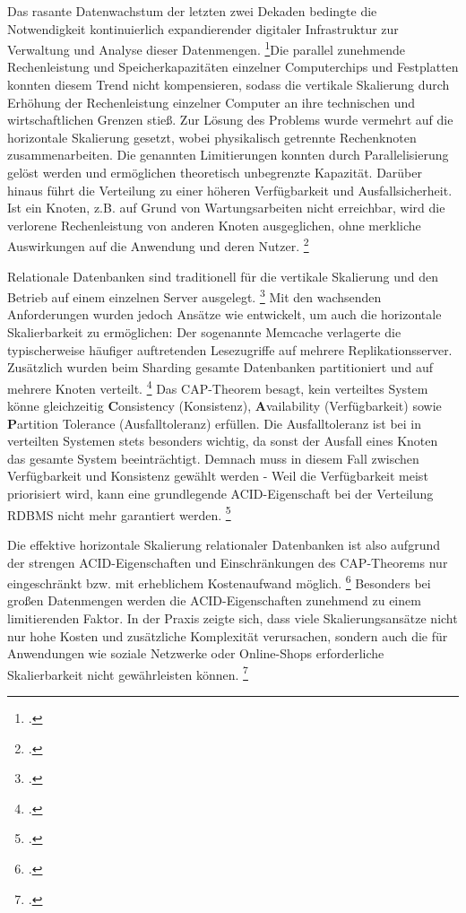 Das rasante Datenwachstum der letzten zwei Dekaden bedingte die Notwendigkeit kontinuierlich expandierender digitaler Infrastruktur zur Verwaltung und Analyse dieser Datenmengen. \footcite{petrocAmountDataCreated2024}Die parallel zunehmende Rechenleistung und Speicherkapazitäten einzelner Computerchips und Festplatten konnten diesem Trend nicht kompensieren, sodass die vertikale Skalierung durch Erhöhung der Rechenleistung einzelner Computer an ihre technischen und wirtschaftlichen Grenzen stieß. Zur Lösung des Problems wurde vermehrt auf die horizontale Skalierung gesetzt, wobei physikalisch getrennte Rechenknoten zusammenarbeiten. Die genannten Limitierungen konnten durch Parallelisierung gelöst werden und ermöglichen theoretisch unbegrenzte Kapazität. Darüber hinaus führt die Verteilung zu einer höheren Verfügbarkeit und Ausfallsicherheit. Ist ein Knoten, z.B. auf Grund von Wartungsarbeiten nicht erreichbar, wird die verlorene Rechenleistung von anderen Knoten ausgeglichen, ohne merkliche Auswirkungen auf die Anwendung und deren Nutzer. \footcite[S. 120]{uyangaComparativeStudyNoSQL2021}

Relationale Datenbanken sind traditionell für die vertikale Skalierung und den Betrieb auf einem einzelnen Server ausgelegt. \footcite{sahatqijaComparisonRelationalNOSQL2018}
Mit den wachsenden Anforderungen wurden jedoch Ansätze wie entwickelt, um auch die horizontale Skalierbarkeit zu ermöglichen: Der sogenannte Memcache verlagerte die typischerweise häufiger auftretenden Lesezugriffe auf mehrere Replikationsserver. Zusätzlich wurden beim Sharding gesamte Datenbanken partitioniert und auf mehrere Knoten verteilt. \footcite[S. 16]{dertingerNoSQLDatenbankenUndNichtrelationale2025} Das CAP-Theorem besagt, kein verteiltes System könne gleichzeitig \textbf{C}onsistency (Konsistenz), \textbf{A}vailability (Verfügbarkeit) sowie \textbf{P}artition Tolerance (Ausfalltoleranz) erfüllen. Die Ausfalltoleranz ist bei in verteilten Systemen stets besonders wichtig, da sonst der Ausfall eines Knoten das gesamte System beeinträchtigt. Demnach muss in diesem Fall zwischen Verfügbarkeit und Konsistenz gewählt werden - Weil die Verfügbarkeit meist priorisiert wird, kann eine grundlegende ACID-Eigenschaft bei der Verteilung RDBMS nicht mehr garantiert werden. \footcite[S. 33 ff.]{meierWerkzeugeDigitalenWirtschaft2018}

Die effektive horizontale Skalierung relationaler Datenbanken ist also aufgrund der strengen ACID-Eigenschaften und Einschränkungen des CAP-Theorems nur eingeschränkt bzw. mit erheblichem Kostenaufwand möglich. \footcite[S. 1]{schreinerWhenRelationalBasedApplications2019} Besonders bei großen Datenmengen werden die ACID-Eigenschaften zunehmend zu einem limitierenden Faktor. In der Praxis zeigte sich, dass viele Skalierungsansätze nicht nur hohe Kosten und zusätzliche Komplexität verursachen, sondern auch die für Anwendungen wie soziale Netzwerke oder Online-Shops erforderliche Skalierbarkeit nicht gewährleisten können. \footcite[S. 41-43]{harrisonNextGenerationDatabases2015}

